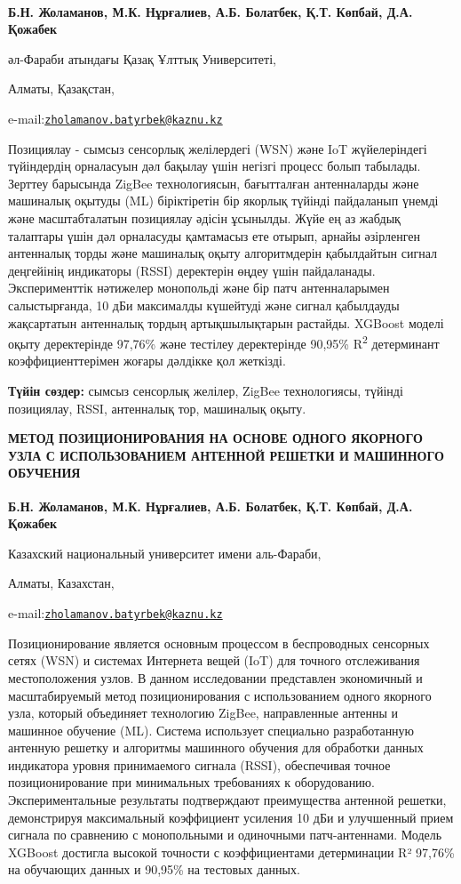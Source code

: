 {\bfseries Б.Н. Жоламанов\textsuperscript{\envelope }, М.К. Нұрғалиев, А.Б.
Болатбек, Қ.Т. Көпбай, Д.А. Қожабек}

әл-Фараби атындағы Қазақ Ұлттық Университеті,

Алматы, Қазақстан,

e-mail:\href{mailto:zholamanov.batyrbek@kaznu.kz}{\nolinkurl{zholamanov.batyrbek@kaznu.kz}}

Позициялау - сымсыз сенсорлық желілердегі (WSN) және IoT жүйелеріндегі
түйіндердің орналасуын дәл бақылау үшін негізгі процесс болып табылады.
Зерттеу барысында ZigBee технологиясын, бағытталған антенналарды және
машиналық оқытуды (ML) біріктіретін бір якорлық түйінді пайдаланып
үнемді және масштабталатын позициялау әдісін ұсынылды. Жүйе ең аз жабдық
талаптары үшін дәл орналасуды қамтамасыз ете отырып, арнайы әзірленген
антенналық торды және машиналық оқыту алгоритмдерін қабылдайтын сигнал
деңгейінің индикаторы (RSSI) деректерін өңдеу үшін пайдаланады.
Эксперименттік нәтижелер монопольді және бір патч антенналарымен
салыстырғанда, 10 дБи максималды күшейтуді және сигнал қабылдауды
жақсартатын антенналық тордың артықшылықтарын растайды. XGBoost моделі
оқыту деректерінде 97,76\% және тестілеу деректерінде 90,95\%
R\textsuperscript{2} детерминант коэффициенттерімен жоғары дәлдікке қол
жеткізді.

{\bfseries Түйін сөздер:} сымсыз сенсорлық желілер, ZigBee технологиясы,
түйінді позициялау, RSSI, антенналық тор, машиналық оқыту.

{\bfseries МЕТОД ПОЗИЦИОНИРОВАНИЯ НА ОСНОВЕ ОДНОГО ЯКОРНОГО УЗЛА С
ИСПОЛЬЗОВАНИЕМ АНТЕННОЙ РЕШЕТКИ И МАШИННОГО ОБУЧЕНИЯ}

{\bfseries Б.Н. Жоламанов\textsuperscript{\envelope }, М.К. Нұрғалиев, А.Б.
Болатбек, Қ.Т. Көпбай, Д.А. Қожабек}

Казахский национальный университет имени аль-Фараби,

Алматы, Казахстан,

e-mail:\href{mailto:zholamanov.batyrbek@kaznu.kz}{\nolinkurl{zholamanov.batyrbek@kaznu.kz}}

Позиционирование является основным процессом в беспроводных сенсорных
сетях (WSN) и системах Интернета вещей (IoT) для точного отслеживания
местоположения узлов. В данном исследовании представлен экономичный и
масштабируемый метод позиционирования с использованием одного якорного
узла, который объединяет технологию ZigBee, направленные антенны и
машинное обучение (ML). Система использует специально разработанную
антенную решетку и алгоритмы машинного обучения для обработки данных
индикатора уровня принимаемого сигнала (RSSI), обеспечивая точное
позиционирование при минимальных требованиях к оборудованию.
Экспериментальные результаты подтверждают преимущества антенной решетки,
демонстрируя максимальный коэффициент усиления 10 дБи и улучшенный прием
сигнала по сравнению с монопольными и одиночными патч-антеннами. Модель
XGBoost достигла высокой точности с коэффициентами детерминации R²
97,76\% на обучающих данных и 90,95\% на тестовых данных.

